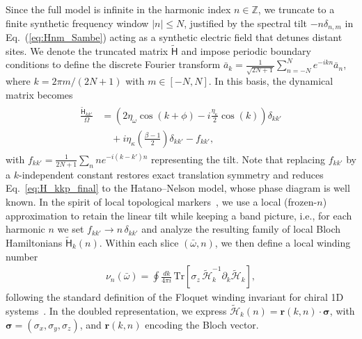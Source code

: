 \documentclass[a4paper,twocolumn,floatfix,10pt,superscriptaddress]%
{quantumarticle}
\newcommand{\mcrc}[1]{{\color{mcrcolor}{[MCR: #1]}}}
\newcommand{\msf}[1]{\mathsf{#1}}
\newcommand{\mcl}[1]{\mathcal{#1}}
\newcommand{\bsb}[1]{\boldsymbol{#1}}
\newcommand{\bomega}{{\bar{\omega}}}
\newcommand{\mcH}{{\mcl{H}}}
\newcommand{\msH}{{\msf{H}}}
\begin{document}
Since the full model is infinite in the harmonic index $n \in \mathbb{Z}$, we truncate to a finite synthetic frequency window $|n| \leq N$, justified by the spectral tilt $-n\delta_{n,m}$ in Eq.~(\ref{eq:Hnm_Sambe}) acting as a synthetic electric field that detunes distant sites. We denote the truncated matrix $\tilde{\msH}$ and impose periodic boundary conditions to define the discrete Fourier transform $\bar{a}_k = \frac{1}{\sqrt{2N+1}} \sum_{n=-N}^N e^{-i k n} \bar{a}_n$, 
where $k = 2\pi m/(2N+1)$ with $m \in [-N,N]$. In this basis, the dynamical matrix becomes
\begin{align}\label{eq:H_kkp_final}
\begin{aligned}
\frac{\tilde{\msH}_{k k'}}{\Omega} &= 
\left( 2 \eta_\omega \cos(k + \phi) 
- i \frac{\eta_\kappa}{2} \cos(k) \right) \delta_{kk'} \\
&\quad + i\eta_\kappa\left( \frac{\beta-1}{2} \right)\delta_{kk'} - f_{kk'},
\end{aligned}
\end{align}
with $f_{kk'} = \frac{1}{2N+1} \sum_n n e^{-i(k - k')n}$ representing the tilt. Note that replacing $f_{kk'}$ by a $k$-independent constant restores exact translation symmetry and reduces Eq.~\eqref{eq:H_kkp_final} to the \mcrc{standard} Hatano–Nelson model, whose phase diagram is well known. In the spirit of local topological markers~\cite{BiancoResta2011}, we use a local (frozen-$n$) approximation to retain the linear tilt while keeping a band picture, i.e., for each harmonic $n$ we set $f_{kk'} \to n\,\delta_{kk'}$ and analyze the resulting family of local Bloch Hamiltonians $\tilde{\msH}_{k}(n)$. Within each slice $(\bomega,n)$, we then define a local winding number
\begin{align}
\label{eq:winding_number_Hbar}
\nu_n(\bomega)
=\oint \frac{dk}{4\pi i}\, \mathrm{Tr}\!\left[\sigma_z\, \tilde{\mcH}_k^{-1}\partial_k \tilde{\mcH}_k\right],
\end{align}
following the standard definition of the Floquet winding invariant for chiral 1D systems~\cite{Kitagawa2010}. In the doubled representation, we express $\tilde{\mcH}_k(n)=\bsb{r}(k,n)\cdot\bsb{\sigma}$, with $\bsb{\sigma}=(\sigma_x,\sigma_y,\sigma_z)$, and $\bsb{r}(k,n)$ encoding the Bloch vector. 
\end{document}

